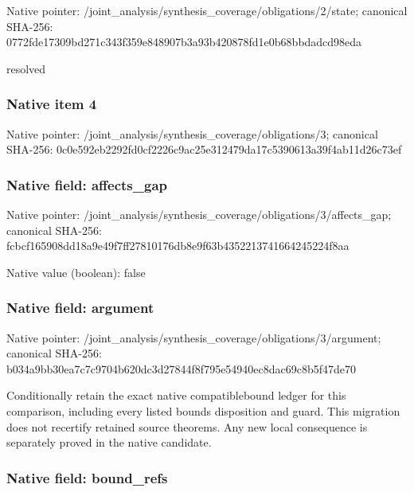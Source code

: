 \documentclass[10pt,a4paper]{article}
\begin{document}
Native pointer: /joint\_analysis/synthesi\allowbreak{}s\_coverage/obligations/2\allowbreak{}/state; canonical SHA-256: 0772fde17309bd271c343f35\allowbreak{}9e848907b3a93b420878fd1e\allowbreak{}0b68bbdadcd98eda


resolved


\subsubsection{Native item 4}


Native pointer: /joint\_analysis/synthesi\allowbreak{}s\_coverage/obligations/3; canonical SHA-256: 0c0e592eb2292fd0cf2226c9\allowbreak{}ac25e312479da17c5390613a\allowbreak{}39f4ab11d26c73ef



\subsubsection{Native field: affects\_gap}


Native pointer: /joint\_analysis/synthesi\allowbreak{}s\_coverage/obligations/3\allowbreak{}/affects\_gap; canonical SHA-256: fcbcf165908dd18a9e49f7ff\allowbreak{}27810176db8e9f63b4352213\allowbreak{}741664245224f8aa



Native value (boolean): false



\subsubsection{Native field: argument}


Native pointer: /joint\_analysis/synthesi\allowbreak{}s\_coverage/obligations/3\allowbreak{}/argument; canonical SHA-256: b034a9bb30ea7c7c9704b620\allowbreak{}dc3d27844f8f795e54940ec8\allowbreak{}dac69c8b5f47de70


Conditionally retain the exact native compatiblebound ledger for this comparison, including every listed bounds disposition and guard. This migration does not recertify retained source theorems. Any new local consequence is separately proved in the native candidate.


\subsubsection{Native field: bound\_refs}
\end{document}
